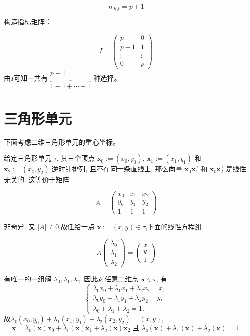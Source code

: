 \documentclass{article}
\begin{document}
$$
n_{dof} = {p+1}
$$

构造指标矩阵：

$$
I = \begin{pmatrix}
p  & 0 \\ p-1 & 1 \\ \vdots & \vdots \\ 0 & p 
\end{pmatrix}
$$
由$I$可知一共有$\begin{matrix} p+1 \\ \overbrace{ 1+1+\cdots+1 }
\end{matrix}$种选择。

\section{三角形单元}
下面考虑二维三角形单元的重心坐标。

给定三角形单元 $\tau$, 其三个顶点 $\mathbf x_0 :=(x_0,y_0)$, $\mathbf x_1 :=(x_1,y_1)$ 和 $\mathbf x_2 :=(x_2,y_2)$ 逆时针排列, 且不在同一条直线上, 那么向量 $\overrightarrow{\mathbf x_0\mathbf x_1}$ 和 $\overrightarrow{\mathbf x_0\mathbf x_2}$ 是线性无关的. 这等价于矩阵

$$
A = 
\begin{pmatrix}
x_0 & x_1 & x_2 \\
y_0 & y_1 & y_2 \\
1   & 1   & 1 
\end{pmatrix}
$$

非奇异. 
又 $|A|\ne 0$,故任给一点 $\mathbf{x}:=(x,y)\in\tau$,下面的线性方程组

$$
A 
\begin{pmatrix}
\lambda_0 \\
\lambda_1\\
\lambda_2  
\end{pmatrix}
=\begin{pmatrix}
x \\
y\\
1  
\end{pmatrix}
$$

有唯一的一组解 $\lambda_0,\lambda_1,\lambda_2$. 
因此对任意二维点 $\mathbf{x}\in\tau$, 有
$$
\begin{cases}
\lambda _0 x_0+\lambda _1 x_1+\lambda _2 x_2=x,\\
\lambda _0 y_0+\lambda _1 y_1+\lambda _2 y_2=y,\\
\lambda _0+ \lambda _1 +\lambda _2 =1.
\end{cases}
$$
故$\lambda _0 (x_0,y_0)+\lambda _1 (x_1,y_1)+\lambda _2 (x_2,y_2)=(x,y)$,
$$
\mathbf{x}=\lambda_0(\mathbf{x})\mathbf{x}_0 + \lambda_1(\mathbf{x})\mathbf{x}_1 + \lambda_2(\mathbf{x})\mathbf{x}_2 
\text{ 且 } \lambda_0(\mathbf{x}) + \lambda_1(\mathbf{x}) + \lambda_2(\mathbf{x}) = 1. 
$$
\end{document}
